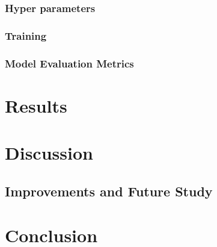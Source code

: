 \documentclass[a4paper,11pt,notitlepage]{article}
\begin{document}

\subsubsection{Hyper parameters}


\subsubsection{Training}


\subsubsection{Model Evaluation Metrics}


\section{Results}


\section{Discussion}


\subsection{Improvements and Future Study}


\section{Conclusion}




\end{document}
